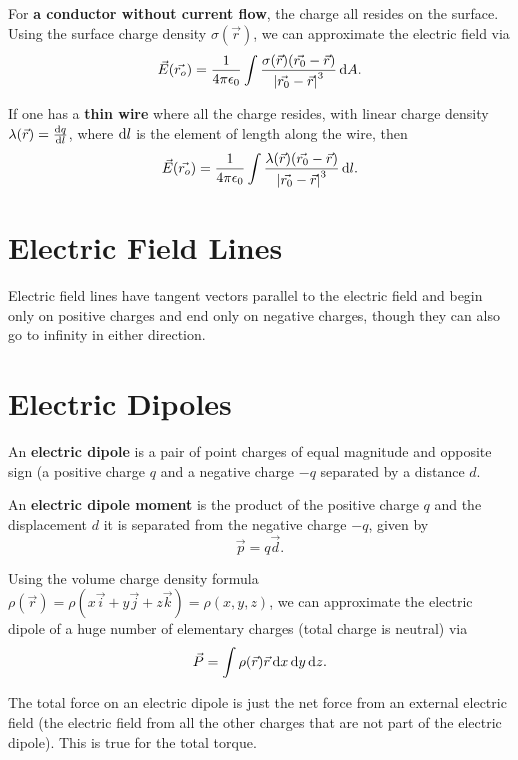 For \textbf{a conductor without current flow}, the charge all resides on the surface. Using the surface charge density $\sigma (\vec{r})$, we can approximate the electric field via
\begin{equation}
\vec{E}(\vec{r_o}) = \frac{1}{4\pi \epsilon_0} \int\frac{\sigma(\vec{r}) (\vec{r_0} - \vec{r})}{\left| \vec{r_0} - \vec{r} \right|^3} \operatorname{d\!} A.
\end{equation}

If one has a \textbf{thin wire} where all the charge resides, with linear charge density $\lambda(\vec{r}) = \frac{\operatorname{d\!} q}{\operatorname{d\!} l}$, where $\operatorname{d\!} l$ is the element of length along the wire, then
\begin{equation}
\vec{E}(\vec{r_o}) = \frac{1}{4\pi \epsilon_0} \int\frac{\lambda(\vec{r}) (\vec{r_0} - \vec{r})}{\left| \vec{r_0} - \vec{r} \right|^3} \operatorname{d\!} l.
\end{equation}

\section{Electric Field Lines}
Electric field lines have tangent vectors parallel to the electric field and begin only on positive charges and end only on negative charges, though they can also go to infinity in either direction.

\section{Electric Dipoles}
An \textbf{electric dipole} is a pair of point charges of equal magnitude and opposite sign (a positive charge $q$ and a negative charge $-q$ separated by a distance $d$.

An \textbf{electric dipole moment} is the product of the positive charge $q$ and the displacement $d$ it is separated from the negative charge $-q$, given by
\begin{equation}
\vec{p} = q\vec{d}.
\end{equation}

Using the volume charge density formula $\rho(\vec{r}) = \rho(x\vec{i} + y\vec{j} + z\vec{k}) = \rho(x, y, z)$, we can approximate the electric dipole of a huge number of elementary charges (total charge is neutral) via
\begin{equation}
\vec{P} = \int\rho(\vec{r})\vec{r}\operatorname{d\!} x \operatorname{d\!} y \operatorname{d\!} z.
\end{equation}

The total force on an electric dipole is just the net force from an external electric field (the electric field from all the other charges that are not part of the electric dipole). This is true for the total torque.

